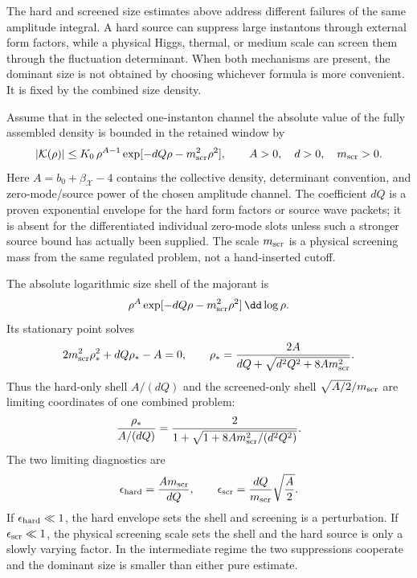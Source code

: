 \begin{controlledapproximation}
\label{ca:hard-screened-instanton-size-shell}
The hard and screened size estimates above address different failures of the
same amplitude integral.  A hard source can suppress large instantons through
external form factors, while a physical Higgs, thermal, or medium scale can
screen them through the fluctuation determinant.  When both mechanisms are
present, the dominant size is not obtained by choosing whichever formula is
more convenient.  It is fixed by the combined size density.

Assume that in the selected one-instanton channel the absolute value of the
fully assembled density is bounded in the retained window by
\begin{equation}
  |\mathcal K(\rho)|
  \le
  K_0\,\rho^{A-1}
  \exp[-dQ\rho-m_{\rm scr}^2\rho^2],
  \qquad
  A>0,\quad d>0,\quad m_{\rm scr}>0.
  \label{eq:hard-screened-size-majorant}
\end{equation}
Here \(A=b_0+\beta_{\mathcal X}-4\) contains the collective density,
determinant convention, and zero-mode/source power of the chosen amplitude
channel.  The coefficient \(dQ\) is a proven exponential envelope for the
hard form factors or source wave packets; it is absent for the differentiated
individual zero-mode slots unless such a stronger source bound has actually
been supplied.  The scale \(m_{\rm scr}\) is a physical screening mass from
the same regulated problem, not a hand-inserted cutoff.

The absolute logarithmic size shell of the majorant is
\[
  \rho^A\exp[-dQ\rho-m_{\rm scr}^2\rho^2]\,\dd\log\rho .
\]
Its stationary point solves
\begin{equation}
  2m_{\rm scr}^2\rho_*^2+dQ\rho_*-A=0,
  \qquad
  \rho_*
  =
  \frac{2A}
       {dQ+\sqrt{d^2Q^2+8A m_{\rm scr}^2}}.
  \label{eq:hard-screened-log-shell}
\end{equation}
Thus the hard-only shell \(A/(dQ)\) and the screened-only shell
\(\sqrt{A/2}/m_{\rm scr}\) are limiting coordinates of one combined
problem:
\[
  \frac{\rho_*}{A/(dQ)}
  =
  \frac{2}{1+\sqrt{1+8A m_{\rm scr}^2/(d^2Q^2)}}.
\]
The two limiting diagnostics are
\[
  \epsilon_{\rm hard}=\frac{A m_{\rm scr}}{dQ},
  \qquad
  \epsilon_{\rm scr}=\frac{dQ}{m_{\rm scr}}\sqrt{\frac A2}.
\]
If \(\epsilon_{\rm hard}\ll1\), the hard envelope sets the shell and
screening is a perturbation.  If \(\epsilon_{\rm scr}\ll1\), the physical
screening scale sets the shell and the hard source is only a slowly varying
factor.  In the intermediate regime the two suppressions cooperate and the
dominant size is smaller than either pure estimate.


\end{controlledapproximation}
